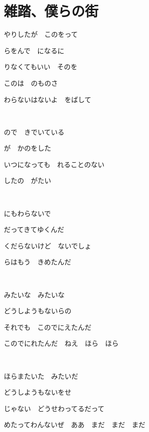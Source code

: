\section{雑踏、僕らの街}

やりしたが　このをって

らをんで　になるに

りなくてもいい　そのを

このは　のものさ

わらないはないよ　をばして

~

ので　きでいている

が　かのをした

いつになっても　れることのない

したの　がたい

~

にもわらないで

だってきてゆくんだ

くだらないけど　ないでしょ

らはもう　きめたんだ

~

みたいな　みたいな

どうしようもないらの

それでも　このでにえたんだ

このでにれたんだ　ねえ　ほら　ほら

~

ほらまたいた　みたいだ

どうしようもないをせ

じゃない　どうせわってるだって

めたってわんないぜ　ああ　まだ　まだ　まだ

